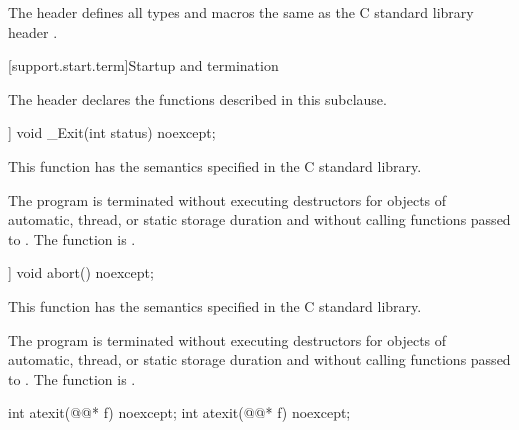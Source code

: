 \pnum
The header defines all types and macros the same as
the C standard library header .


[support.start.term]{Startup and termination}

\pnum
\begin{note}
The header 
declares the functions described in this subclause.
\end{note}

%
\begin{itemdecl}
[[noreturn]] void _Exit(int status) noexcept;
\end{itemdecl}

\begin{itemdescr}
\pnum
\effects
This function has the semantics specified in the C standard library.

\pnum
\remarks
The program is terminated without executing destructors for objects of automatic,
thread, or static storage duration and without calling functions passed to
.
%
The function  is .
\end{itemdescr}

%
\begin{itemdecl}
[[noreturn]] void abort() noexcept;
\end{itemdecl}

\begin{itemdescr}
\pnum
\effects
This function has the semantics specified in the C standard library.

\pnum
\remarks
The program is terminated without executing destructors for objects of
automatic, thread, or static storage
duration and without calling functions passed to
.
%
The function  is .
\end{itemdescr}

%
\begin{itemdecl}
int atexit(@@* f) noexcept;
int atexit(@@* f) noexcept;
\end{itemdecl}

